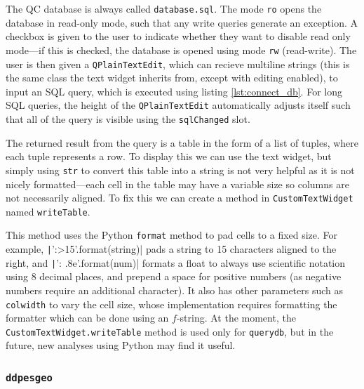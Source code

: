 \documentclass[12pt]{article}
\begin{document}
The QC database is always called \texttt{database.sql}. The mode \texttt{ro} opens the database in read-only mode, such that any write queries generate an exception. A checkbox is given to the user to indicate whether they want to disable read only mode---if this is checked, the database is opened using mode \texttt{rw} (read-write). The user is then given a \texttt{QPlainTextEdit}, which can recieve multiline strings (this is the same class the text widget inherits from, except with editing enabled), to input an SQL query, which is executed using listing \ref{lst:connect_db}. For long SQL queries, the height of the \texttt{QPlainTextEdit} automatically adjusts itself such that all of the query is visible using the \texttt{sqlChanged} slot.

The returned result from the query is a table in the form of a list of tuples, where each tuple represents a row. To display this we can use the text widget, but simply using \texttt{str} to convert this table into a string is not very helpful as it is not nicely formatted---each cell in the table may have a variable size so columns are not necessarily aligned. To fix this we can create a method in \texttt{CustomTextWidget} named \texttt{writeTable}.

This method uses the Python \texttt{format} method to pad cells to a fixed size. For example, \texttt|'{:>15}'.format(string)| pads a string to 15 characters aligned to the right, and \texttt|'{: .8e}'.format(num)| formats a float to always use scientific notation using 8 decimal places, and prepend a space for positive numbers (as negative numbers require an additional character). It also has other parameters such as \texttt{colwidth} to vary the cell size, whose implementation requires formatting the formatter which can be done using an \(f\)-string. At the moment, the \texttt{CustomTextWidget.writeTable} method is used only for \texttt{querydb}, but in the future, new analyses using Python may find it useful.

\subsubsection{\texttt{ddpesgeo}}\label{sssec:ddpesgeo}
\end{document}

